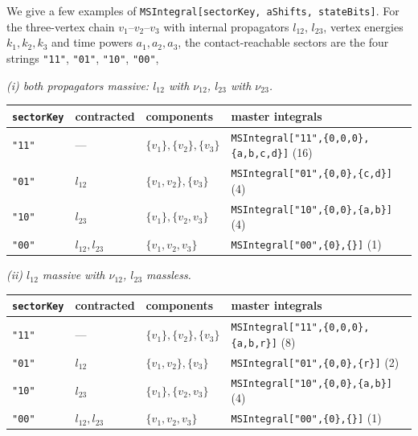 \documentclass[11pt,a4paper]{article}
\begin{document}
We give a few examples of \texttt{MSIntegral[sectorKey, aShifts, stateBits]}. For the three-vertex chain $v_1$--$v_2$--$v_3$ with internal propagators $l_{12}$, $l_{23}$, vertex
energies $k_1,k_2,k_3$ and time powers $a_1,a_2,a_3$, the contact-reachable sectors are the four
strings \texttt{"11"}, \texttt{"01"}, \texttt{"10"}, \texttt{"00"},
\begin{center}
\emph{(i) both propagators massive: $l_{12}$ with $\nu_{12}$, $l_{23}$ with $\nu_{23}$.}\\[2pt]
\footnotesize\begin{tabular}{@{}lllp{5.8cm}@{}}
\toprule
\texttt{sectorKey} & contracted & components & master integrals\\
\midrule
\texttt{"11"} & --- & $\{v_1\},\{v_2\},\{v_3\}$
  & \texttt{MSIntegral["11",\{0,0,0\},\{a,b,c,d\}]} (16)\\
\texttt{"01"} & $l_{12}$ & $\{v_1,v_2\},\{v_3\}$
  & \texttt{MSIntegral["01",\{0,0\},\{c,d\}]} (4)\\
\texttt{"10"} & $l_{23}$ & $\{v_1\},\{v_2,v_3\}$
  & \texttt{MSIntegral["10",\{0,0\},\{a,b\}]} (4)\\
\texttt{"00"} & $l_{12},l_{23}$ & $\{v_1,v_2,v_3\}$
  & \texttt{MSIntegral["00",\{0\},\{\}]} (1)\\
\bottomrule
\end{tabular}
\end{center}
\begin{center}
\emph{(ii) $l_{12}$ massive with $\nu_{12}$, $l_{23}$ massless.}\\[2pt]
\footnotesize\begin{tabular}{@{}lllp{5.8cm}@{}}
\toprule
\texttt{sectorKey} & contracted & components & master integrals\\
\midrule
\texttt{"11"} & --- & $\{v_1\},\{v_2\},\{v_3\}$
  & \texttt{MSIntegral["11",\{0,0,0\},\{a,b,r\}]} (8)\\
\texttt{"01"} & $l_{12}$ & $\{v_1,v_2\},\{v_3\}$
  & \texttt{MSIntegral["01",\{0,0\},\{r\}]} (2)\\
\texttt{"10"} & $l_{23}$ & $\{v_1\},\{v_2,v_3\}$
  & \texttt{MSIntegral["10",\{0,0\},\{a,b\}]} (4)\\
\texttt{"00"} & $l_{12},l_{23}$ & $\{v_1,v_2,v_3\}$
  & \texttt{MSIntegral["00",\{0\},\{\}]} (1)\\
\bottomrule
\end{tabular}
\end{center}
\end{document}

